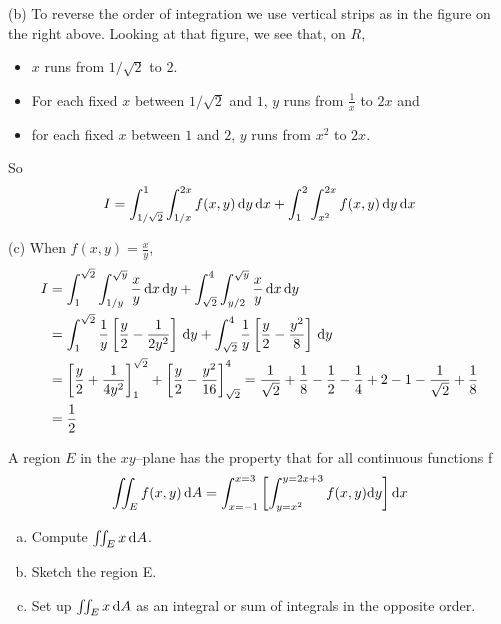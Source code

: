 \begin{solution}
(b) To reverse the order of integration we use vertical strips as in
the figure on the right above. Looking at that figure, we see that, on $R$,
\begin{itemize}
\item
$x$ runs from $1/\sqrt{2}$ to $2$.
\item 
For each fixed $x$ between $1/\sqrt{2}$ and $1$, $y$ runs from $\frac{1}{x}$
to $2x$ and 
\item 
for each fixed $x$ between $1$ and $2$, $y$ runs from $x^2$
to $2x$.
\end{itemize}
So
\begin{align*}
I= \int_{1/\sqrt{2}}^1 \int_{1/x}^{2x} f(x,y)\,\mathrm{d}y\,\mathrm{d}x
    +\int_1^2 \int_{x^2}^{2x} f(x,y)\,\mathrm{d}y\,\mathrm{d}x
\end{align*}

(c) When $f(x,y)=\frac{x}{y}$,
\begin{align*}
I &= \int_1^{\sqrt{2}} \int_{1/y}^{\sqrt{y}} \frac{x}{y}\,\mathrm{d}x\,\mathrm{d}y
    +\int_{\sqrt{2}}^4 \int_{y/2}^{\sqrt{y}} \frac{x}{y}\,\mathrm{d}x\,\mathrm{d}y \\
  &=\int_1^{\sqrt{2}} \frac{1}{y}\left[\frac{y}{2}-\frac{1}{2y^2}\right]
                                               \,\mathrm{d}y
    +\int_{\sqrt{2}}^4 \frac{1}{y}\left[\frac{y}{2}-\frac{y^2}{8}\right]
                                               \,\mathrm{d}y \\
  &=\left[\frac{y}{2}+\frac{1}{4y^2}\right]_1^{\sqrt{2}}
    +\left[\frac{y}{2}-\frac{y^2}{16}\right]_{\sqrt{2}}^4 
   =\frac{1}{\sqrt{2}} +\frac{1}{8}-\frac{1}{2}-\frac{1}{4}
     +2 -1 -\frac{1}{\sqrt{2}} +\frac{1}{8} \\
  &=\frac{1}{2}
\end{align*}
\end{solution}

\begin{question}[M200 2007A] \label{prob_s3.1f}  %
A region $E$ in the $xy$--plane has the property that for all 
continuous functions f
\begin{equation*}
\iint_E f(x,y)\,\mathrm{d}A
= \int_{x=-1}^{x=3}\left[\int_{y=x^2}^{y=2x+3} f(x,y) \mathrm{d}y\right] \mathrm{d}x
\end{equation*}

\begin{enumerate}[(a)]
\item 
 Compute $\iint_E x\,\mathrm{d}A$.
 
\item 
 Sketch the region E.

\item
 Set up $\iint_E x\,\mathrm{d}A$ as an integral or sum of integrals 
in the opposite order.
\end{enumerate}
\end{question}

